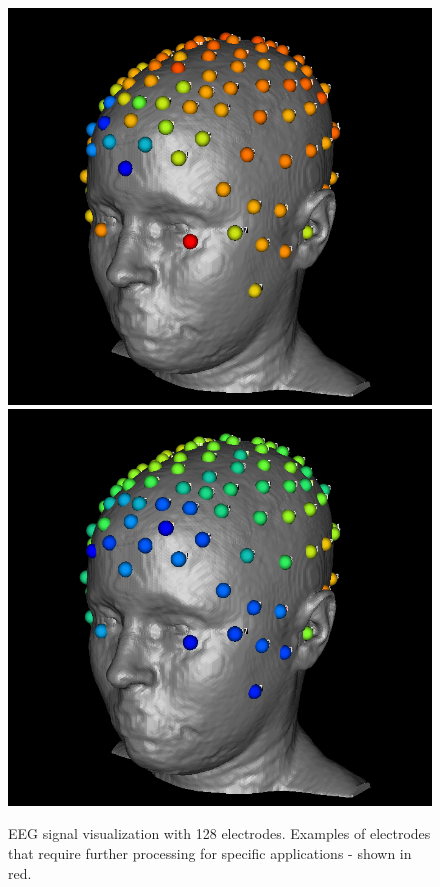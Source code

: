 \begin{figure}[H]
\begin{center}
\includegraphics[width=.49\textwidth]{Figures/128_eeg_1}
\includegraphics[width=.49\textwidth]{Figures/128_eeg_2}
\caption{EEG signal visualization with 128 electrodes. Examples of electrodes that require further processing for specific applications - shown in red.}
\label{fig:eegvis}
\end{center}
\end{figure}


